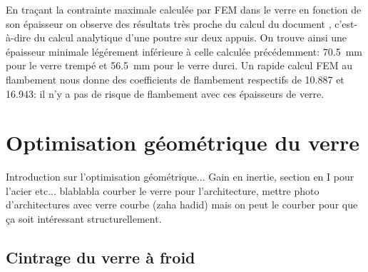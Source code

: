 \documentclass[11pt,titlepage]{article}
\begin{document}
En traçant la contrainte maximale calculée par \acrshort{FEM} dans le verre en fonction de son épaisseur on observe des résultats très proche du calcul du document \cite{fdp78}, c'est-à-dire du calcul analytique d'une poutre sur deux appuis. On trouve ainsi une épaisseur minimale légérement inférieure à celle calculée précédemment: \qty{70.5}{\milli\meter} pour le verre trempé et \qty{56.5}{\milli\meter} pour le verre durci. Un rapide calcul \acrshort{FEM} au flambement nous donne des coefficients de flambement respectifs de 10.887 et 16.943: il n'y a pas de risque de flambement avec ces épaisseurs de verre. 
\newpage

\section{Optimisation géométrique du verre}

Introduction sur l'optimisation géométrique... Gain en inertie, section en I pour l'acier etc...
blablabla courber le verre pour l'architecture, mettre photo d'architectures avec verre courbe (zaha hadid)
mais on peut le courber pour que ça soit intéressant structurellement.

\newpage
\subsection{Cintrage du verre à froid}
\end{document}
